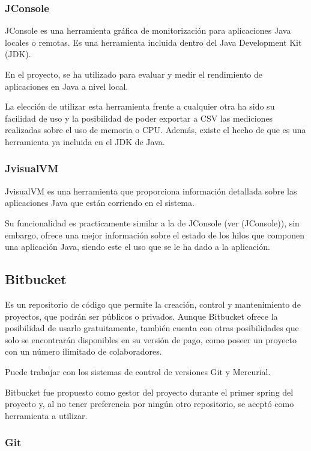 \subsubsection{JConsole}\label{DefJConsole}

JConsole es una herramienta gráfica de monitorización para aplicaciones Java locales o remotas. Es una herramienta incluida dentro del Java Development Kit (JDK).

En el proyecto, se ha utilizado para evaluar y medir el rendimiento de aplicaciones en Java a nivel local.

La elección de utilizar esta herramienta frente a cualquier otra ha sido su facilidad de uso y la posibilidad de poder exportar a CSV las mediciones realizadas sobre el uso de memoria o CPU. Además, existe el hecho de que es una herramienta ya incluida en el JDK de Java.



\subsubsection{JvisualVM}\label{DefJvisualVM}
JvisualVM es una herramienta que proporciona información detallada sobre las aplicaciones Java que están corriendo en el sistema.

Su funcionalidad es practicamente similar a la de JConsole (ver \nameref(JConsole)), sin embargo, ofrece una mejor información sobre el estado de los hilos que componen una aplicación Java, siendo este el uso que se le ha dado a la aplicación.

\subsection{Bitbucket}\label{DefBitbucket}
Es un repositorio de código que permite la creación, control y mantenimiento de proyectos, que podrán ser públicos o privados. Aunque Bitbucket ofrece la posibilidad de usarlo gratuitamente, también cuenta con otras posibilidades que solo se encontrarán disponibles en su versión de pago, como poseer un proyecto con un número ilimitado de colaboradores.

Puede trabajar con los sistemas de control de versiones Git y Mercurial.

Bitbucket fue propuesto como gestor del proyecto durante el primer spring del proyecto y, al no tener preferencia por ningún otro repositorio, se aceptó como herramienta a utilizar.

\subsubsection{Git}

